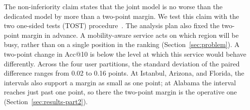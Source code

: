 The non-inferiority claim states that the joint model is no worse than the dedicated model by more than a two-point margin. We test this claim with the two one-sided tests (TOST) procedure~\cite{lakens2017tost}. The analysis plan also fixed the two-point margin in advance. A mobility-aware service acts on which region will be busy, rather than on a single position in the ranking (Section~\ref{sec:problem}). A two-point change in Acc@10 is below the level at which this service would behave differently. Across the four user partitions, the standard deviation of the paired difference ranges from 0.02 to 0.16 points. At Istanbul, Arizona, and Florida, the intervals also support a margin as small as one point; at Alabama the interval reaches just past one point, so there the two-point margin is the operative one (Section~\ref{sec:results-part2}).
